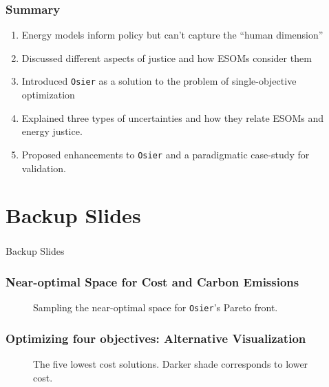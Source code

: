 \begin{frame}
    \frametitle{Summary}
    \begin{enumerate}
        \item Energy models inform policy but can't capture the ``human dimension''
        \item Discussed different aspects of justice and how ESOMs consider them
        \item Introduced \texttt{Osier} as a solution to the problem of single-objective optimization
        \item Explained three types of uncertainties and how they relate ESOMs and energy justice.
        \item Proposed enhancements to \texttt{Osier} and a paradigmatic case-study for validation.
    \end{enumerate}

\end{frame}


\section*{Backup Slides}

\begin{frame}
    \frametitle{}

    \begin{center}
        \Huge Backup Slides
    \end{center}
    
\end{frame}

\begin{frame}
    \frametitle{Near-optimal Space for Cost and Carbon Emissions}

    \begin{figure}
        \centering 
        \resizebox{0.75\columnwidth}{!}{}
        \caption{Sampling the near-optimal space for \texttt{Osier}'s Pareto
        front.}
        \label{fig:osier-temoa-benchmark-1}
    \end{figure}

\end{frame}


\begin{frame}
    \frametitle{Optimizing four objectives: Alternative Visualization}

    \begin{figure}
        \centering 
        \resizebox{0.9\columnwidth}{!}{}
        \caption{The five lowest cost solutions. Darker shade corresponds to lower cost.}
        \label{fig:4-obj-design-space-total-cost}
    \end{figure}

\end{frame}

